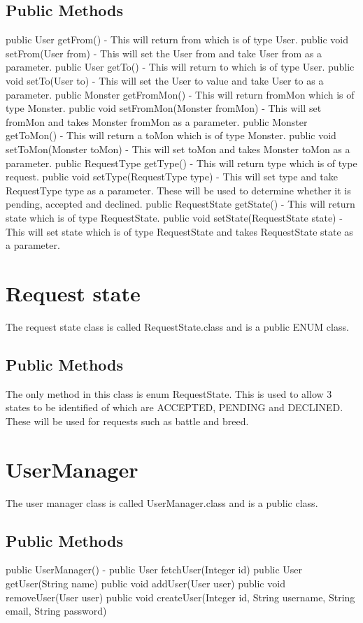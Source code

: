 \documentclass{project}
\begin{document}
\subsection{Public Methods}
public User getFrom() - This will return from which is of type User. public void setFrom(User from) - This will set the User from and take User from as a parameter.
public User getTo() - This will return to which is of type User. public void setTo(User to) - This will set the User to value and take User to as a parameter.
public Monster getFromMon() - This will return fromMon which is of type Monster. public void setFromMon(Monster fromMon) - This will set fromMon and takes Monster fromMon as a parameter.
public Monster getToMon() - This will return a toMon which is of type Monster. public void setToMon(Monster toMon) - This will set toMon and takes Monster toMon as a parameter.
public RequestType getType() - This will return type which is of type request. public void setType(RequestType type) - This will set type and take RequestType type as a parameter. These will be used to determine whether it is pending, accepted and declined.
public RequestState getState() - This will return state which is of type RequestState. public void setState(RequestState state) - This will set state which is of type RequestState and takes RequestState state as a parameter.

\section{Request state}
The request state class is called RequestState.class and is a public ENUM class.
\subsection{Public Methods}
The only method in this class is enum RequestState. This is used to allow 3 states to be identified of which are ACCEPTED, PENDING and DECLINED. These will be used for requests such as battle and breed.

\section{UserManager}
The user manager class is called UserManager.class and is a public class.
\subsection{Public Methods}
public UserManager() - 
public User fetchUser(Integer id)
public User getUser(String name)
public void addUser(User user)
public void removeUser(User user)
public void createUser(Integer id, String username, String email, String password)
\end{document}
